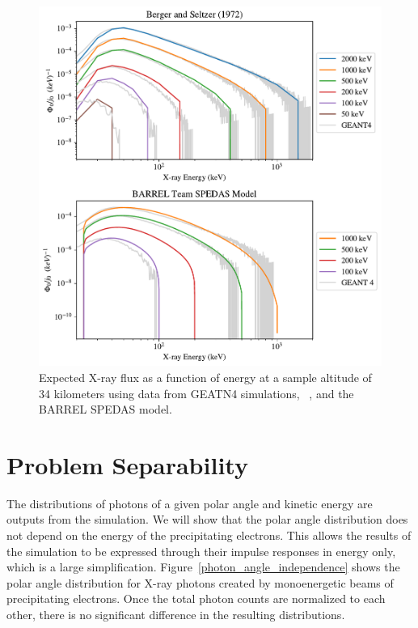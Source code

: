 \begin{figure}[p]
\label{barrel_berger_spedas_comparison_34}
\includegraphics[width=\textwidth]{figures/chapter_3/barrel_berger_spedas_comparison/barrel_berger_spedas_comparison_alt_40km_3}
\caption{Expected X-ray flux as a function of energy at a sample altitude of 34 kilometers using data from GEATN4 simulations, ~\cite{Berger1972}, and the BARREL SPEDAS model.}
\end{figure}

\section{Problem Separability}

The distributions of photons of a given polar angle and kinetic energy are outputs from the simulation. We will show that the polar angle distribution does not depend on the energy of the precipitating electrons. This allows the results of the simulation to be expressed through their impulse responses in energy only, which is a large simplification. Figure~\ref{photon_angle_independence} shows the polar angle distribution for X-ray photons created by monoenergetic beams of precipitating electrons. Once the total photon counts are normalized to each other, there is no significant difference in the resulting distributions.

